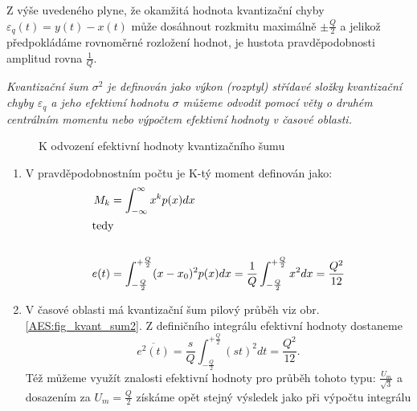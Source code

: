 {      Z výše uvedeného plyne, že okamžitá hodnota kvantizační chyby $\varepsilon_q(t) = y(t) - x(t)$ může dosáhnout rozkmitu maximálně $\pm \frac{Q}{2}$ a jelikož předpokládáme rovnoměrné rozložení hodnot, je hustota pravděpodobnosti amplitud rovna $\frac{1}{Q}$.

      \emph{Kvantizační šum $\sigma^2$ je definován jako výkon (rozptyl) střídavé složky kvantizační chyby $\varepsilon_q$ a jeho efektivní hodnotu $\sigma$ můžeme odvodit pomocí věty o druhém centrálním momentu nebo výpočtem efektivní hodnoty v časové oblasti.}

        \begin{figure}[ht!]
          \centering
          \caption{K odvození efektivní hodnoty kvantizačního šumu}
          \label{AES:fig_kvant_sum}
        \end{figure}

        \begin{enumerate}
          \item V pravděpodobnostním počtu je K-tý moment definován jako: 
                \begin{align*}
                  M_k  &= \int_{-\infty}^{\infty} x^k p(x)dx  \\
                  \shortintertext{tedy}                       \\
                  e(t) &= \int_{-\frac{Q}{2}}^{+\frac{Q}{2}}(x - x_0)^2p(x)dx = 
                                 \frac{1}{Q}\int_{-\frac{Q}{2}}^{+\frac{Q}{2}}x^2dx = \frac{Q^2}{12}
                \end{align*}
          \item V časové oblasti má kvantizační šum pilový průběh viz obr.    
                \ref{AES:fig_kvant_sum2}. Z  definičního integrálu efektivní hodnoty dostaneme $$ 
                \overline{e^2(t)} =               
                \frac{s}{Q}\int_{-\frac{Q}{2}}^{+\frac{Q}{2}}(st)^2dt = \frac{Q^2}{12}.$$ Též 
                můžeme využít znalosti efektivní hodnoty pro průběh tohoto typu: 
                $\frac{U_m}{\sqrt{3}}$ a dosazením za $U_m =\frac{Q}{2}$ získáme opět stejný 
                výsledek jako při výpočtu integrálu
        \end{enumerate}

}
